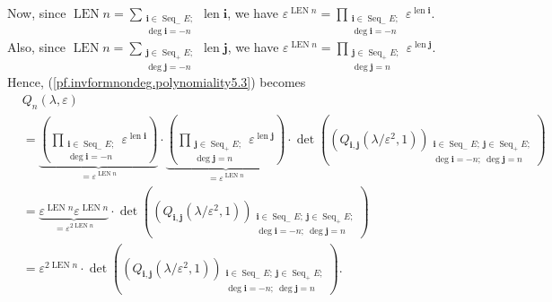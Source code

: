 \documentclass
[numbers=enddot,12pt,final,onecolumn,german,notitlepage]{scrartcl}%
\theoremstyle{definition}
\begin{document}
Now, since $\operatorname*{LEN}n=\sum\limits_{\substack{\mathbf{i}%
\in\operatorname*{Seq}\nolimits_{-}E;\\\deg\mathbf{i}=-n}}\operatorname*{len}%
\mathbf{i}$, we have $\varepsilon^{\operatorname*{LEN}n}=\prod
\limits_{\substack{\mathbf{i}\in\operatorname*{Seq}\nolimits_{-}%
E;\\\deg\mathbf{i}=-n}}\varepsilon^{\operatorname*{len}\mathbf{i}}$. Also,
since $\operatorname*{LEN}n=\sum\limits_{\substack{\mathbf{j}\in
\operatorname*{Seq}\nolimits_{+}E;\\\deg\mathbf{j}=-n}}\operatorname*{len}%
\mathbf{j}$, we have $\varepsilon^{\operatorname*{LEN}n}=\prod
\limits_{\substack{\mathbf{j}\in\operatorname*{Seq}\nolimits_{+}%
E;\\\deg\mathbf{j}=n}}\varepsilon^{\operatorname*{len}\mathbf{j}}$. Hence,
(\ref{pf.invformnondeg.polynomiality5.3}) becomes%
\begin{align}
&  Q_{n}\left(  \lambda,\varepsilon\right) \nonumber\\
&  =\underbrace{\left(  \prod\limits_{\substack{\mathbf{i}\in
\operatorname*{Seq}\nolimits_{-}E;\\\deg\mathbf{i}=-n}}\varepsilon
^{\operatorname*{len}\mathbf{i}}\right)  }_{=\varepsilon^{\operatorname*{LEN}%
n}}\cdot\underbrace{\left(  \prod\limits_{\substack{\mathbf{j}\in
\operatorname*{Seq}\nolimits_{+}E;\\\deg\mathbf{j}=n}}\varepsilon
^{\operatorname*{len}\mathbf{j}}\right)  }_{=\varepsilon^{\operatorname*{LEN}%
n}}\cdot\det\left(  \left(  Q_{\mathbf{i},\mathbf{j}}\left(  \lambda
/\varepsilon^{2},1\right)  \right)  _{\substack{\mathbf{i}\in
\operatorname*{Seq}\nolimits_{-}E;\ \mathbf{j}\in\operatorname*{Seq}%
\nolimits_{+}E;\\\deg\mathbf{i}=-n;\ \deg\mathbf{j}=n}}\right) \nonumber\\
&  =\underbrace{\varepsilon^{\operatorname*{LEN}n}\varepsilon
^{\operatorname*{LEN}n}}_{=\varepsilon^{2\operatorname*{LEN}n}}\cdot
\det\left(  \left(  Q_{\mathbf{i},\mathbf{j}}\left(  \lambda/\varepsilon
^{2},1\right)  \right)  _{\substack{\mathbf{i}\in\operatorname*{Seq}%
\nolimits_{-}E;\ \mathbf{j}\in\operatorname*{Seq}\nolimits_{+}E;\\\deg
\mathbf{i}=-n;\ \deg\mathbf{j}=n}}\right) \nonumber\\
&  =\varepsilon^{2\operatorname*{LEN}n}\cdot\det\left(  \left(  Q_{\mathbf{i}%
,\mathbf{j}}\left(  \lambda/\varepsilon^{2},1\right)  \right)
_{\substack{\mathbf{i}\in\operatorname*{Seq}\nolimits_{-}E;\ \mathbf{j}%
\in\operatorname*{Seq}\nolimits_{+}E;\\\deg\mathbf{i}=-n;\ \deg\mathbf{j}%
=n}}\right)  . \label{pf.invformnondeg.polynomiality5.4}%
\end{align}
\end{document}
